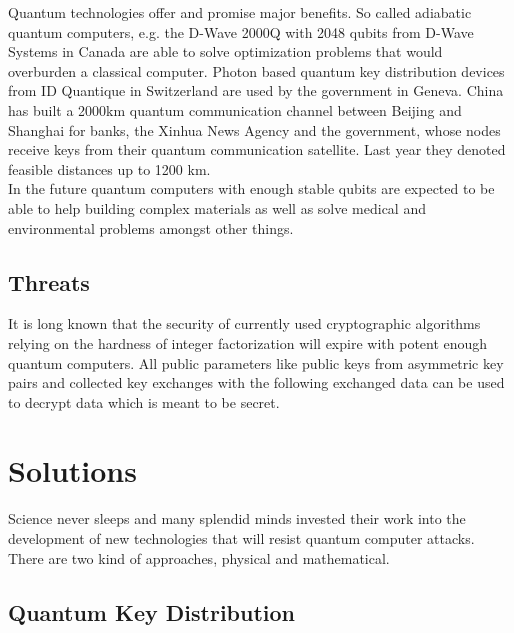 \documentclass[a4paper,11pt]{article}
\begin{document}
\begin{multicols}{2}
Quantum technologies offer and promise major benefits. So called adiabatic quantum computers, e.g. the D-Wave 2000Q with 2048 qubits from D-Wave Systems in Canada are able to solve optimization problems that would overburden a classical computer. Photon based quantum key distribution devices from ID Quantique in Switzerland are used by the government in Geneva. China has built a 2000km quantum communication channel between Beijing and Shanghai for banks, the Xinhua News Agency and the government, whose nodes receive keys from their quantum communication satellite. Last year they denoted feasible distances up to 1200 km. \\
In the future quantum computers with enough stable qubits are expected to be able to help building complex materials as well as solve medical and environmental problems amongst other things.

\subsection{Threats}

It is long known that the security of currently used cryptographic algorithms relying on the hardness of integer factorization will expire with potent enough quantum computers. All public parameters like public keys from asymmetric key pairs and collected key exchanges with the following exchanged data can be used to decrypt data which is meant to be secret. \\



\section{\Large{Solutions}}

Science never sleeps and many splendid minds invested their work into the development of new technologies that will resist quantum computer attacks. There are two kind of approaches, physical and mathematical.

\subsection{Quantum Key Distribution}


\end{multicols}
\end{document}

